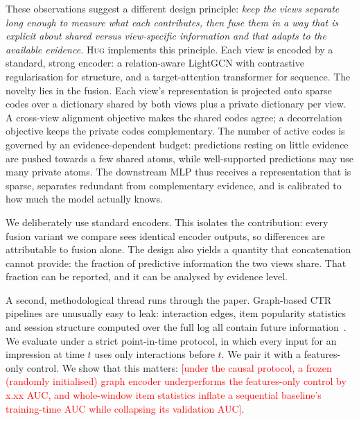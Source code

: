 \documentclass[sigconf,anonymous,review]{acmart}
\newcommand{\tbd}[1]{\textcolor{red}{[#1]}}
\newcommand{\method}{\textsc{Hug}}      %
\begin{document}
These observations suggest a different design principle: \emph{keep the
views separate long enough to measure what each contributes, then fuse them
in a way that is explicit about shared versus view-specific information and
that adapts to the available evidence.} \method{} implements this principle.
Each view is encoded by a standard, strong encoder: a relation-aware LightGCN
with contrastive regularisation for structure, and a target-attention
transformer for sequence. The novelty lies in the fusion. Each view's
representation is projected onto sparse codes over a dictionary shared by both
views plus a private dictionary per view. A cross-view alignment objective
makes the shared codes agree; a decorrelation objective keeps the private codes
complementary. The number of active codes is governed by an evidence-dependent
budget: predictions resting on little evidence are pushed towards a few shared
atoms, while well-supported predictions may use many private atoms. The
downstream MLP thus receives a representation that is sparse, separates
redundant from complementary evidence, and is calibrated to how much the model
actually knows.

We deliberately use standard encoders. This isolates the contribution: every
fusion variant we compare sees identical encoder outputs, so differences are
attributable to fusion alone. The design also yields a quantity that
concatenation cannot provide: the fraction of predictive information the two
views share. That fraction can be reported, and it can be analysed by evidence
level.

A second, methodological thread runs through the paper. Graph-based CTR
pipelines are unusually easy to leak: interaction edges, item popularity
statistics and session structure computed over the full log all contain
future information~\cite{ji2023leakage}. We evaluate under a strict
point-in-time protocol, in which every input for an impression at time $t$
uses only interactions before $t$. We pair it with a features-only control.
We show that this matters: \tbd{under the causal protocol, a frozen
(randomly initialised) graph encoder underperforms the features-only control
by x.xx AUC, and whole-window item statistics inflate a sequential baseline's
training-time AUC while collapsing its validation AUC}.
\end{document}
